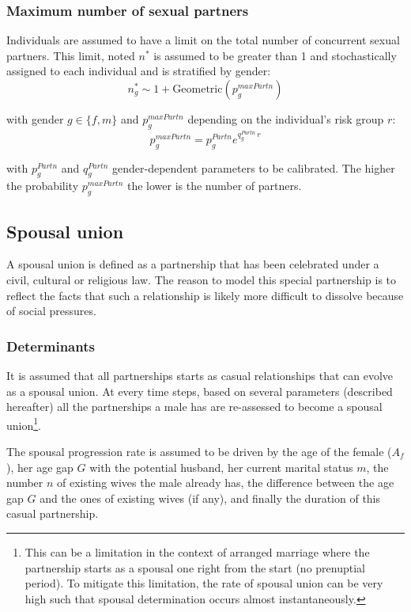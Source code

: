 \documentclass[11pt, onecolumn]{article}
\begin{document}
\subsubsection{Maximum number of sexual partners}

Individuals are assumed to have a limit on the total number of concurrent sexual partners. This limit, noted $n^*$ is assumed to be greater than 1 and  stochastically assigned to each individual and is stratified by gender:
$$n^*_g \sim 1+\mathrm{Geometric}(p^{maxPartn}_g)$$

with gender $g\in\{f,m\}$ and $p^{maxPartn}_g$ depending on the individual's risk group $r$:
$$ p^{maxPartn}_g =  p^{Partn}_g e^{q^{Partn}_g \, r}$$

with  $p^{Partn}_g$ and $q^{Partn}_g$ gender-dependent parameters to be calibrated. The higher the probability $p^{maxPartn}_g$ the lower is the number of partners.



\subsection{Spousal union}

A spousal union is defined as a partnership that has been celebrated under a civil, cultural or religious law. The reason to model this special partnership is to reflect the facts that such a relationship is likely more difficult to dissolve because of social pressures.

\subsubsection{Determinants}

It is assumed that all partnerships starts as casual relationships that can evolve as a spousal union. At every time steps, based on several parameters (described hereafter) all the partnerships a male has are re-assessed to become a spousal union\footnote{This can be a limitation in the context of arranged marriage where the partnership starts as a spousal one right from the start (no prenuptial period). To mitigate this limitation, the rate of spousal union can be very high such that spousal determination occurs almost instantaneously.}.

The spousal progression rate is assumed to be driven by the age of the female ($A_f$), her age gap $G$ with the potential husband, her current marital status $m$, the number $n$ of existing wives the male already has, the difference between the age gap $G$ and the ones of existing wives (if any), and finally the duration of this casual partnership.
\end{document}
